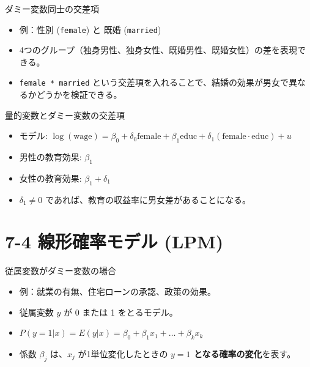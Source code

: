 \documentclass[
  ignorenonframetext,
]{beamer}
\providecommand{\tightlist}{%
  \setlength{\itemsep}{0pt}\setlength{\parskip}{0pt}}
\begin{document}
\begin{frame}[fragile]{ダミー変数同士の交差項}
\protect\hypertarget{ux30c0ux30dfux30fcux5909ux6570ux540cux58ebux306eux4ea4ux5deeux9805}{}
\begin{itemize}
\tightlist
\item
  例：性別 (\texttt{female}) と 既婚 (\texttt{married})
\item
  4つのグループ（独身男性、独身女性、既婚男性、既婚女性）の差を表現できる。
\item
  \texttt{female\ *\ married}
  という交差項を入れることで、結婚の効果が男女で異なるかどうかを検証できる。
\end{itemize}
\end{frame}

\begin{frame}{量的変数とダミー変数の交差項}
\protect\hypertarget{ux91cfux7684ux5909ux6570ux3068ux30c0ux30dfux30fcux5909ux6570ux306eux4ea4ux5deeux9805}{}
\begin{itemize}
\tightlist
\item
  モデル:
  \(\log(\text{wage}) = \beta_0 + \delta_0 \text{female} + \beta_1 \text{educ} + \delta_1 (\text{female} \cdot \text{educ}) + u\)
\item
  男性の教育効果: \(\beta_1\)
\item
  女性の教育効果: \(\beta_1 + \delta_1\)
\item
  \(\delta_1 \neq 0\) であれば、教育の収益率に男女差があることになる。
\end{itemize}
\end{frame}

\hypertarget{ux7ddaux5f62ux78baux7387ux30e2ux30c7ux30eb-lpm}{%
\section{7-4 線形確率モデル
(LPM)}\label{ux7ddaux5f62ux78baux7387ux30e2ux30c7ux30eb-lpm}}

\begin{frame}{従属変数がダミー変数の場合}
\protect\hypertarget{ux5f93ux5c5eux5909ux6570ux304cux30c0ux30dfux30fcux5909ux6570ux306eux5834ux5408}{}
\begin{itemize}
\tightlist
\item
  例：就業の有無、住宅ローンの承認、政策の効果。
\item
  従属変数 \(y\) が 0 または 1 をとるモデル。
\item
  \(P(y=1 | x) = E(y | x) = \beta_0 + \beta_1 x_1 + \dots + \beta_k x_k\)
\item
  係数 \(\beta_j\) は、\(x_j\) が1単位変化したときの \textbf{\(y=1\)
  となる確率の変化}を表す。
\end{itemize}
\end{frame}
\end{document}
